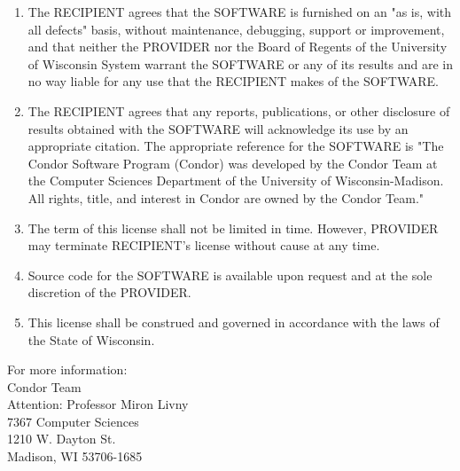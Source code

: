 \begin{enumerate}
\item The RECIPIENT agrees that the SOFTWARE is furnished on an "as
is, with all defects" basis, without maintenance, debugging, support
or improvement, and that neither the PROVIDER nor the Board of Regents
of the University of Wisconsin System warrant the SOFTWARE or any of
its results and are in no way liable for any use that the RECIPIENT
makes of the SOFTWARE.

\item The RECIPIENT agrees that any reports, publications, or other
disclosure of results obtained with the SOFTWARE will acknowledge its
use by an appropriate citation. The appropriate reference for the
SOFTWARE is "The Condor Software Program (Condor) was developed by the
Condor Team at the Computer Sciences Department of the University of
Wisconsin-Madison. All rights, title, and interest in Condor are owned
by the Condor Team."

\item The term of this license shall not be limited in time. However,
PROVIDER may terminate RECIPIENT's license without cause at any
time.

\item Source code for the SOFTWARE is available upon request and at
the sole discretion of the PROVIDER.

\item This license shall be construed and governed in accordance with
the laws of the State of Wisconsin.

\end{enumerate}

\begin{flushleft}
For more information: \\

Condor Team \\
Attention: Professor Miron Livny \\
7367 Computer Sciences \\ 
1210 W. Dayton St. \\
Madison, WI 53706-1685 \\
 \\
 \\
\end{flushleft}




